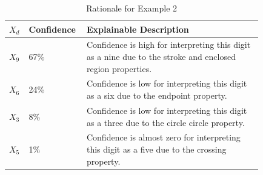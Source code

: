 \documentclass[conference]{IEEEtran}
\begin{document}
\begin{table}[htbp]
\caption{Probabilistic voting, effectiveness, and explainability for Example 2}
\centering
{}
\label{table:example2}
\end{table}

\begin{table}[htbp]
\caption{Rationale for Example 2}
\centering
\begin{tabular}{| p{0.04\linewidth} | p{0.14\linewidth} | p{0.65\linewidth} |}
\hline
 $X_d$ & Confidence & Explainable Description \\
\hline \cline{1-3}
$X_9$ & 67\% & Confidence is high for interpreting this digit as a nine due to the stroke and enclosed region properties. \\
\hline
$X_6$ & 24\% & Confidence is low for interpreting this digit as a six due to the endpoint property.  \\
\hline
$X_3$ & 8\% & Confidence is low for interpreting this digit as a three due to the circle circle property.  \\ 
\hline
$X_5$ & 1\% & Confidence is almost zero for interpreting this digit as a five due to the crossing property. \\
\hline
\end{tabular}
\label{table:exexample2}
\end{table}
\end{document}
